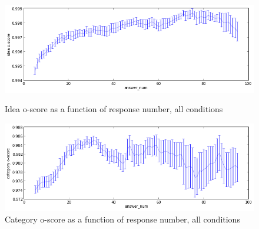 


\begin{figure}[h]
    \centering
    \includegraphics[width=0.9\columnwidth]{idea_oscore_order}
    \caption{Idea o-score as a function of response number, all conditions}
    \includegraphics[width=0.9\columnwidth]{cat_oscore_order}
    \caption{Category o-score as a function of response number, all conditions}
\end{figure}

